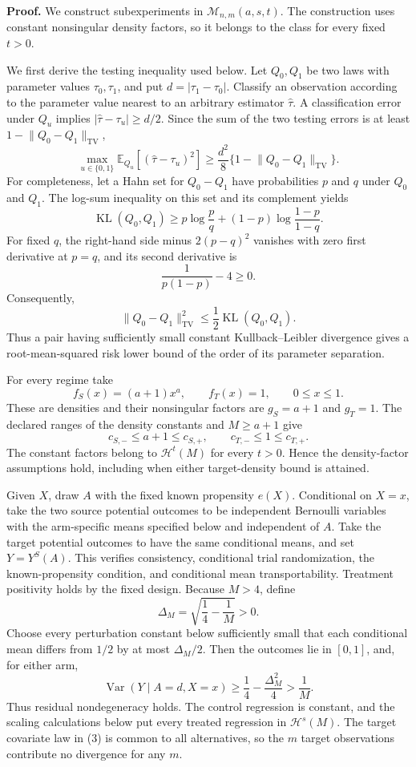 \textbf{Proof.}
We construct subexperiments in \(\mathcal M_{n,m}(a,s,t)\).  The construction uses constant nonsingular density factors, so it belongs to the class for every fixed \(t>0\).

We first derive the testing inequality used below.  Let \(Q_0,Q_1\) be two laws with parameter values \(\tau_0,\tau_1\), and put \(d=|\tau_1-\tau_0|\).  Classify an observation according to the parameter value nearest to an arbitrary estimator \(\widehat\tau\).  A classification error under \(Q_u\) implies \(|\widehat\tau-\tau_u|\ge d/2\).  Since the sum of the two testing errors is at least \(1-\lVert Q_0-Q_1\rVert_{\mathrm{TV}}\),
\[
 \max_{u\in\{0,1\}}\mathbb E_{Q_u}
       [ (\widehat\tau-\tau_u)^2 ]
 \ge \frac{d^2}{8}
       \{1-\lVert Q_0-Q_1\rVert_{\mathrm{TV}}\}.
\tag{1}
\]
For completeness, let a Hahn set for \(Q_0-Q_1\) have probabilities \(p\) and \(q\) under \(Q_0\) and \(Q_1\).  The log-sum inequality on this set and its complement yields
\[
 \operatorname{KL}(Q_0,Q_1)
 \ge p\log\frac pq+(1-p)\log\frac{1-p}{1-q}.
\]
For fixed \(q\), the right-hand side minus \(2(p-q)^2\) vanishes with zero first derivative at \(p=q\), and its second derivative is
\[
 \frac{1}{p(1-p)}-4\ge0.
\]
Consequently,
\[
 \lVert Q_0-Q_1\rVert_{\mathrm{TV}}^2
 \le \frac12\operatorname{KL}(Q_0,Q_1).
\tag{2}
\]
Thus a pair having sufficiently small constant Kullback--Leibler divergence gives a root-mean-squared risk lower bound of the order of its parameter separation.

For every regime take
\[
 f_S(x)=(a+1)x^a,
 \qquad f_T(x)=1,
 \qquad 0\le x\le1.
\tag{3}
\]
These are densities and their nonsingular factors are \(g_S=a+1\) and \(g_T=1\).  The declared ranges of the density constants and \(M\ge a+1\) give
\[
 c_{S,-}\le a+1\le c_{S,+},
 \qquad c_{T,-}\le1\le c_{T,+}.
\tag{4}
\]
The constant factors belong to \(\mathcal H^t(M)\) for every \(t>0\).  Hence the density-factor assumptions hold, including when either target-density bound is attained.

Given \(X\), draw \(A\) with the fixed known propensity \(e(X)\).  Conditional on \(X=x\), take the two source potential outcomes to be independent Bernoulli variables with the arm-specific means specified below and independent of \(A\).  Take the target potential outcomes to have the same conditional means, and set \(Y=Y^S(A)\).  This verifies consistency, conditional trial randomization, the known-propensity condition, and conditional mean transportability.  Treatment positivity holds by the fixed design.  Because \(M>4\), define
\[
 \Delta_M=\sqrt{\frac14-\frac1M}>0.
\]
Choose every perturbation constant below sufficiently small that each conditional mean differs from \(1/2\) by at most \(\Delta_M/2\).  Then the outcomes lie in \([0,1]\), and, for either arm,
\[
 \operatorname{Var}(Y\mid A=d,X=x)
 \ge \frac14-\frac{\Delta_M^2}{4}
 >\frac1M.
\tag{5}
\]
Thus residual nondegeneracy holds.  The control regression is constant, and the scaling calculations below put every treated regression in \(\mathcal H^s(M)\).  The target covariate law in (3) is common to all alternatives, so the \(m\) target observations contribute no divergence for any \(m\).

